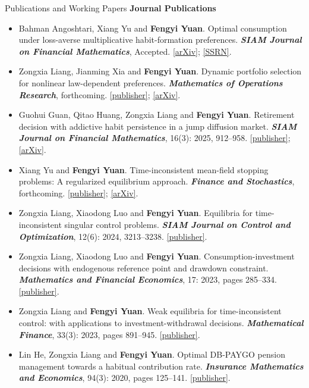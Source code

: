 \documentclass[
	11pt, %
]{resume} %
\begin{document}
\begin{rSection}{Publications and Working Papers}
\textbf{Journal Publications}
\begin{itemize}
    \item Bahman Angoshtari, Xiang Yu and \textbf{Fengyi Yuan}. Optimal consumption under loss-averse multiplicative habit-formation preferences. \textit{\textbf{SIAM Journal on Financial Mathematics}}, Accepted. \href{https://arxiv.org/abs/2406.20063}{[arXiv]}; \href{https://papers.ssrn.com/sol3/papers.cfm?abstract_id=4879543}{[SSRN]}.
    \item Zongxia Liang, Jianming Xia and \textbf{Fengyi Yuan}. Dynamic portfolio selection for nonlinear law-dependent preferences. \textit{\textbf{Mathematics of Operations Research}}, forthcoming. \href{https://pubsonline.informs.org/doi/10.1287/moor.2023.0345}{[publisher]}; \href{https://arxiv.org/abs/2311.06745}{[arXiv]}.
    \item Guohui Guan, Qitao Huang, Zongxia Liang and \textbf{Fengyi Yuan}. Retirement decision with addictive habit persistence in a jump diffusion market. \textit{\textbf{SIAM Journal on Financial Mathematics}}, 16(3): 2025, 912--958. \href{https://epubs.siam.org/doi/10.1137/23M1591116}{[publisher]}; \href{https://arxiv.org/abs/2011.10166}{[arXiv]}.
    \item Xiang Yu and \textbf{Fengyi Yuan}. Time-inconsistent mean-field stopping problems: A regularized equilibrium approach. \textit{\textbf{Finance and Stochastics}}, forthcoming. \href{https://link.springer.com/article/10.1007/s00780-025-00581-5}{[publisher]}; \href{https://arxiv.org/abs/2311.00381}{[arXiv]}.
    \item Zongxia Liang, Xiaodong Luo and \textbf{Fengyi Yuan}. Equilibria for time-inconsistent singular control problems. \textit{\textbf{SIAM Journal on Control and Optimization}}, 12(6): 2024, 3213--3238. \href{https://epubs.siam.org/doi/10.1137/23M1609701}{[publisher]}.
    \item Zongxia Liang, Xiaodong Luo and \textbf{Fengyi Yuan}. Consumption-investment decisions with endogenous reference point and drawdown constraint. \textit{\textbf{Mathematics and Financial Economics}}, 17: 2023, pages 285--334. \href{https://link.springer.com/article/10.1007/s11579-023-00335-x}{[publisher]}.
    \item Zongxia Liang and \textbf{Fengyi Yuan}. Weak equilibria for time-inconsistent control: with applications to investment-withdrawal decisions. \textit{\textbf{Mathematical Finance}}, 33(3): 2023, pages 891--945. \href{https://onlinelibrary.wiley.com/doi/abs/10.1111/mafi.12391}{[publisher]}.
    \item Lin He, Zongxia Liang and \textbf{Fengyi Yuan}. Optimal DB-PAYGO pension management towards a habitual contribution rate. \textit{\textbf{Insurance Mathematics and Economics}}, 94(3): 2020, pages 125--141. \href{https://www.sciencedirect.com/science/article/abs/pii/S0167668720301050}{[publisher]}.
\end{itemize}
\end{rSection}
\end{document}
